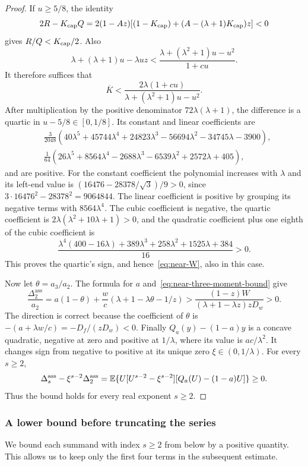 \begin{proof}
If $u\ge5/8$, the identity
\[
 2R-K_{\rm cap}Q
 =2(1-Az)[(1-K_{\rm cap})+(A-(\lambda+1)K_{\rm cap})z]<0
\]
gives $R/Q<K_{\rm cap}/2$. Also
\[
 \lambda+(\lambda+1)u-\lambda uz
 <\frac{\lambda+(\lambda^2+1)u-u^2}{1+cu}.
\]
It therefore suffices that
\[
 \overline K<\frac{2\lambda(1+cu)}{\lambda+(\lambda^2+1)u-u^2}.
\]
After multiplication by the positive denominator $72\lambda(\lambda+1)$, the difference is a quartic in $u-5/8\in[0,1/8]$. Its constant and linear coefficients are
\[
\begin{split}
 &\frac3{2048}(40\lambda^5+45744\lambda^4+24823\lambda^3
                     -56694\lambda^2-34745\lambda-3900),\\
 &\frac1{64}(26\lambda^5+8564\lambda^4-2688\lambda^3
                     -6539\lambda^2+2572\lambda+405),
\end{split}
\]
and are positive. For the constant coefficient the polynomial increases with $\lambda$ and its left-end value is $(16476-28378/\sqrt3)/9>0$, since $3\cdot16476^2-28378^2=9064844$. The linear coefficient is positive by grouping its negative terms with $8564\lambda^4$. The cubic coefficient is negative, the quartic coefficient is $2\lambda(\lambda^2+10\lambda+1)>0$, and the quadratic coefficient plus one eighth of the cubic coefficient is
\[
 \frac{\lambda^4(400-16\lambda)+389\lambda^3+258\lambda^2+1525\lambda+384}{16}>0.
\]
This proves the quartic's sign, and hence~\eqref{eq:near-W}, also in this case.

Now let $\theta=a_3/a_2$. The formula for $a$ and~\eqref{eq:near-three-moment-bound} give
\[
 \frac{\Delta_2^{\mathrm{ass}}}{a_2}
 =a(1-\theta)+\frac wc(\lambda+1-\lambda\theta-1/z)
 >\frac{(1-z)W}{(\lambda+1-\lambda z)zD_w}>0.
\]
The direction is correct because the coefficient of $\theta$ is
$-(a+\lambda w/c)=-D_f/(zD_w)<0$.
Finally $Q_a(y)-(1-a)y$ is a concave quadratic, negative at zero and positive at $1/\lambda$, where its value is $ac/\lambda^2$. It changes sign from negative to positive at its unique zero $\xi\in(0,1/\lambda)$. For every $s\ge2$,
\[
 \Delta_s^{\mathrm{ass}}-\xi^{s-2}\Delta_2^{\mathrm{ass}}
 =\mathbb E\{U[U^{s-2}-\xi^{s-2}][Q_a(U)-(1-a)U]\}\ge0.
\]
Thus the bound holds for every real exponent $s\ge2$.
\end{proof}

\subsubsection{A lower bound before truncating the series}
We bound each summand with index $s\ge2$ from below by a positive quantity. This allows us to keep only the first four terms in the subsequent estimate.

